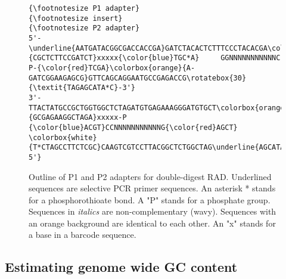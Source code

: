 \documentclass[a4paper,12pt,times,authoryear,twoside,print,index]{Classes/PhDThesisPSnPDF}\usepackage[]{graphicx}\usepackage[]{color}
\begin{document}
\begin{figure}[H]
\begin{Verbatim}[fontfamily=courier, fontsize=\relsize{-7}, commandchars=\\\{\}] 
          {\footnotesize P1 adapter}                                        {\footnotesize insert}                                   {\footnotesize P2 adapter}
5'-\underline{AATGATACGGCGACCACCGA}GATCTACACTCTTTCCCTACACGA\colorbox{white}{CGCTCTTCCGATCT}xxxxx{\color{blue}TGC*A}     GGNNNNNNNNNNNC     P-{\color{red}TCGA}\colorbox{orange}{A-GATCGGAAGAGCG}GTTCAGCAGGAATGCCGAGACCG\rotatebox{30}{\textit{TAGAGCATA*C}-3'}
3'-TTACTATGCCGCTGGTGGCTCTAGATGTGAGAAAGGGATGTGCT\colorbox{orange}{GCGAGAAGGCTAGA}xxxxx-P    {\color{blue}ACGT}CCNNNNNNNNNNNG{\color{red}AGCT}       \colorbox{white}{T*CTAGCCTTCTCGC}CAAGTCGTCCTTACGGCTCTGGCTAG\underline{AGCATACGGCAGAAGACGAAC-5'}
\end{Verbatim}
\caption{Outline of P1 and P2 adapters for double-digest RAD. Underlined sequences are selective PCR primer sequences. An asterisk * stands for a phosphorothioate bond. A "P" stands for a phosphate group. Sequences in \textit{italics} are non-complementary (wavy). Sequences with an orange background are identical to each other. An "x" stands for a base in a barcode sequence.}
\label{adapter_outline} %
\end{figure}


\subsection{Estimating genome wide GC content}\label{ch:gc}
\end{document}
